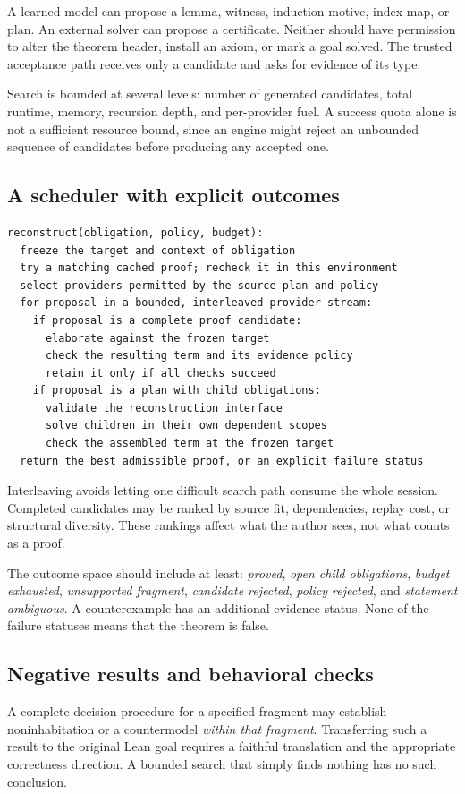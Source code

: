 \documentclass[11pt,a4paper]{article}
\theoremstyle{definition}
\theoremstyle{remark}
\numberwithin{equation}{section}
\begin{document}
A learned model can propose a lemma, witness, induction motive, index map, or plan. An external solver can propose a certificate. Neither should have permission to alter the theorem header, install an axiom, or mark a goal solved. The trusted acceptance path receives only a candidate and asks for evidence of its type.

Search is bounded at several levels: number of generated candidates, total runtime, memory, recursion depth, and per-provider fuel. A success quota alone is not a sufficient resource bound, since an engine might reject an unbounded sequence of candidates before producing any accepted one.

\subsection{A scheduler with explicit outcomes}
\begin{lstlisting}[caption={Algorithmic sketch, not an implementation.}]
reconstruct(obligation, policy, budget):
  freeze the target and context of obligation
  try a matching cached proof; recheck it in this environment
  select providers permitted by the source plan and policy
  for proposal in a bounded, interleaved provider stream:
    if proposal is a complete proof candidate:
      elaborate against the frozen target
      check the resulting term and its evidence policy
      retain it only if all checks succeed
    if proposal is a plan with child obligations:
      validate the reconstruction interface
      solve children in their own dependent scopes
      check the assembled term at the frozen target
  return the best admissible proof, or an explicit failure status
\end{lstlisting}
Interleaving avoids letting one difficult search path consume the whole session. Completed candidates may be ranked by source fit, dependencies, replay cost, or structural diversity. These rankings affect what the author sees, not what counts as a proof.

The outcome space should include at least: \emph{proved}, \emph{open child obligations}, \emph{budget exhausted}, \emph{unsupported fragment}, \emph{candidate rejected}, \emph{policy rejected}, and \emph{statement ambiguous}. A counterexample has an additional evidence status. None of the failure statuses means that the theorem is false.

\subsection{Negative results and behavioral checks}
A complete decision procedure for a specified fragment may establish noninhabitation or a countermodel \emph{within that fragment}. Transferring such a result to the original Lean goal requires a faithful translation and the appropriate correctness direction. A bounded search that simply finds nothing has no such conclusion.
\end{document}
